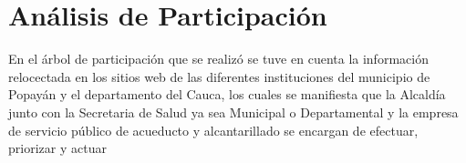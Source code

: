 \section{Análisis de Participación}
  

  En el árbol de participación que se realizó se tuve en cuenta la información relocectada en los sitios web de las diferentes instituciones del municipio de Popayán y el departamento del Cauca, los cuales se manifiesta que la Alcaldía junto con la Secretaria de Salud ya sea Municipal o Departamental y la empresa de servicio público de acueducto y alcantarillado se encargan de efectuar, priorizar y actuar  

